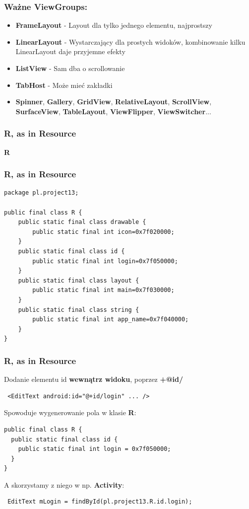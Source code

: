 \documentclass{beamer}
\begin{document}
\begin{frame}\frametitle{Ważne ViewGroups:}
\begin{itemize}
 \item \textbf{FrameLayout} - Layout dla tylko jednego elementu, najprostszy
 \item \textbf{LinearLayout} - Wystarczający dla prostych widoków, kombinowanie kilku LinearLayout daje przyjemne efekty
 \item \textbf{ListView} - Sam dba o scrollowanie
 \item \textbf{TabHost} - Może mieć zakładki
 \pause \item \textbf{Spinner}, \textbf{Gallery}, \textbf{GridView}, \textbf{RelativeLayout}, \textbf{ScrollView}, \textbf{SurfaceView}, \textbf{TableLayout}, \textbf{ViewFlipper}, \textbf{ViewSwitcher}...
\end{itemize}
\end{frame}


\begin{frame}\frametitle{R, as in Resource}  
\begin{center}
 \Huge{\textbf{R}}
\end{center}
\end{frame}

\begin{frame}[fragile]\frametitle{R, as in Resource}
 \begin{lstlisting}
package pl.project13;

public final class R {
    public static final class drawable {
        public static final int icon=0x7f020000;
    }
    public static final class id {
        public static final int login=0x7f050000;
    }
    public static final class layout {
        public static final int main=0x7f030000;
    }
    public static final class string {
        public static final int app_name=0x7f040000;
    }
}
 \end{lstlisting}
\end{frame}

\begin{frame}[fragile] \frametitle{R, as in Resource}  
 Dodanie elementu id \textbf{wewnątrz widoku}, poprzez \textbf{+@id/}
\begin{lstlisting}
 <EditText android:id="@+id/login" ... />
\end{lstlisting}

\pause

Spowoduje wygenerowanie pola w klasie \textbf{R}:
\begin{lstlisting}
public final class R {
  public static final class id {
    public static final int login = 0x7f050000;
  }
}
\end{lstlisting}

\pause

A skorzystamy z niego w np. \textbf{Activity}:
\begin{lstlisting}
 EditText mLogin = findById(pl.project13.R.id.login);
\end{lstlisting}
\end{frame}
\end{document}

